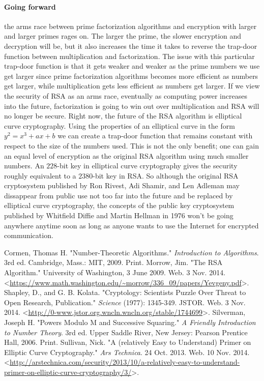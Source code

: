 \documentclass[12pt]{article}
\theoremstyle{remark}
\begin{document}
\paragraph{Going forward} the arms race between prime factorization algorithms and encryption with larger and larger primes rages on.  The larger the prime, the slower encryption and decryption will be, but it also increases the time it takes to reverse the trap-door function between multiplication and factorization. The issue with this particular trap-door function is that it gets weaker and weaker as the prime numbers we use get larger since prime factorization algorithms becomes more efficient as numbers get larger, while multiplication gets less efficient as numbers get larger.  If we view the security of RSA as an arms race, eventually as computing power increases into the future, factorization is going to win out over multiplication and RSA will no longer be secure.  Right now, the future of the RSA algorithm is elliptical curve cryptography.  Using the properties of an elliptical curve in the form $y^2=x^3+ax+b$ we can create a trap-door function that remains constant with respect to the size of the numbers used.  This is not the only benefit; one can gain an equal level of encryption as the original RSA algorithm using much smaller numbers.  An $228$-bit key in elliptical curve cryptography gives the security roughly equivalent to a $2380$-bit key in RSA.  So although the original RSA cryptosystem published by Ron Rivest, Adi Shamir, and Len Adleman may dissappear from public use not too far into the future and be replaced by elliptical curve cryptography, the concepts of the public key cryptosystem published by Whitfield Diffie and Martin Hellman in 1976 won't be going anywhere anytime soon as long as anyone wants to use the Internet for encrypted communication.


\begin{thebibliography}{9}

 Cormen, Thomas H. "Number-Theoretic Algorithms." \emph{Introduction to Algorithms}. 3rd ed. Cambridge, Mass.: MIT, 2009. Print. 
 Morrow, Jim. "The RSA Algorithm." University of Washington, 3 June 2009. Web. 3 Nov. 2014. \textless\url{https://www.math.washington.edu/~morrow/336_09/papers/Yevgeny.pdf}\textgreater.
 Shapley, D., and G. B. Kolata. "Cryptology: Scientists Puzzle Over Threat to Open Research, Publication." \emph{Science} (1977): 1345-349. JSTOR. Web. 3 Nov. 2014. \textless\url{http://0-www.jstor.org.wncln.wncln.org/stable/1744699}\textgreater.
 Silverman, Joseph H. "Powers Modulo M and Successive Squaring." \emph{A Friendly Introduction to Number Theory}. 3rd ed. Upper Saddle River, New Jersey: Pearson Prentice Hall, 2006. Print.
 Sullivan, Nick. "A (relatively Easy to Understand) Primer on Elliptic Curve Cryptography." \emph{Ars Technica}. 24 Oct. 2013. Web. 10 Nov. 2014. \textless\url{http://arstechnica.com/security/2013/10/a-relatively-easy-to-understand-primer-on-elliptic-curve-cryptography/3/}\textgreater. 


\end{thebibliography}
\end{document}

